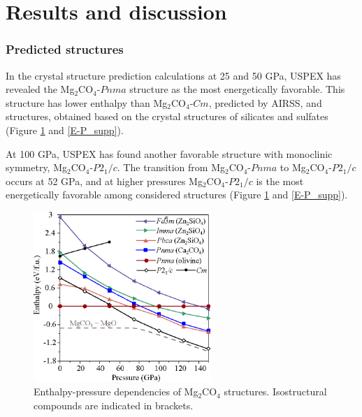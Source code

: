 \documentclass[a4paperm]{article}
\begin{document}

			\section*{Results and discussion}
 
\subsubsection*{Predicted structures}
In the crystal structure prediction calculations at 25 and 50 GPa, USPEX has revealed the Mg$_2$CO$_4$-$Pnma$ structure as the most energetically favorable.
This structure has lower enthalpy than Mg$_2$CO$_4$-$Cm$, predicted by AIRSS, and structures, obtained based on the crystal structures of silicates and sulfates (Figure \ref{E-P} and \ref{E-P_supp}).

At 100 GPa, USPEX has found another favorable structure with monoclinic symmetry, Mg$_2$CO$_4$-$P2_1/c$.
The transition from Mg$_2$CO$_4$-$Pnma$ to Mg$_2$CO$_4$-$P2_1/c$ occurs at 52 GPa, and at higher pressures Mg$_2$CO$_4$-$P2_1/c$ is the most energetically favorable among considered structures (Figure \ref{E-P} and \ref{E-P_supp}). 

\begin{figure}[H]
	\includegraphics[width=0.6\textwidth]{E-P_mg2co4} \centering
	\caption{Enthalpy-pressure dependencies of Mg$_2$CO$_4$ structures. Isostructural compounds are indicated in brackets.
} \label{E-P}
\end{figure} 
\end{document}
